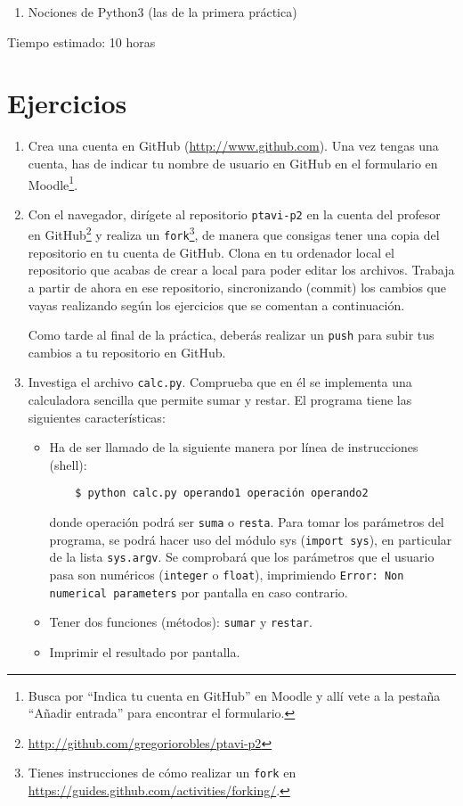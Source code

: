 \documentclass[11pt,a4paper]{article}
\begin{document}
\begin{enumerate}
  \item Nociones de Python3 (las de la primera práctica)
\end{enumerate}

Tiempo estimado: 10 horas

\section{Ejercicios}

\begin{enumerate}

  \item Crea una cuenta en GitHub (\url{http://www.github.com}). Una vez tengas una cuenta, has de indicar tu nombre de usuario en GitHub en el formulario en Moodle\footnote{Busca por ``Indica tu cuenta en GitHub'' en Moodle y allí vete a la pestaña ``Añadir entrada'' para encontrar el formulario.}.
  
    \item Con el navegador, dirígete al repositorio \texttt{ptavi-p2} en la cuenta del profesor en GitHub\footnote{\url{http://github.com/gregoriorobles/ptavi-p2}} y realiza un \texttt{fork}\footnote{Tienes instrucciones de cómo realizar un \texttt{fork} en \url{https://guides.github.com/activities/forking/}.}, de manera que consigas tener una copia del repositorio en tu cuenta de GitHub. Clona en tu ordenador local el repositorio que acabas de crear a local para poder editar los archivos. Trabaja a partir de ahora en ese repositorio, sincronizando (commit) los cambios que vayas realizando según los ejercicios que se comentan a continuación.

  Como tarde al final de la práctica, deberás realizar un \texttt{push} para subir tus cambios a tu repositorio en GitHub.

  \item Investiga el archivo \texttt{calc.py}. Comprueba que en él se implementa una calculadora sencilla que permite sumar y restar. El programa tiene las siguientes características:
  \begin{itemize}
    \item Ha de ser llamado de la siguiente manera por línea de instrucciones (shell):
    \begin{verbatim}
    $ python calc.py operando1 operación operando2
    \end{verbatim}
donde operación podrá ser \texttt{suma} o \texttt{resta}. Para tomar los parámetros del programa, se podrá hacer uso del módulo sys (\texttt{import sys}), en particular de la lista \texttt{sys.argv}. Se comprobará que los parámetros que el usuario pasa son numéricos (\texttt{integer} o \texttt{float}), imprimiendo \texttt{Error: Non numerical parameters} por pantalla en caso contrario.
    \item Tener dos funciones (métodos): \texttt{sumar} y \texttt{restar}.
    \item Imprimir el resultado por pantalla.
  \end{itemize}



\end{enumerate}
\end{document}
